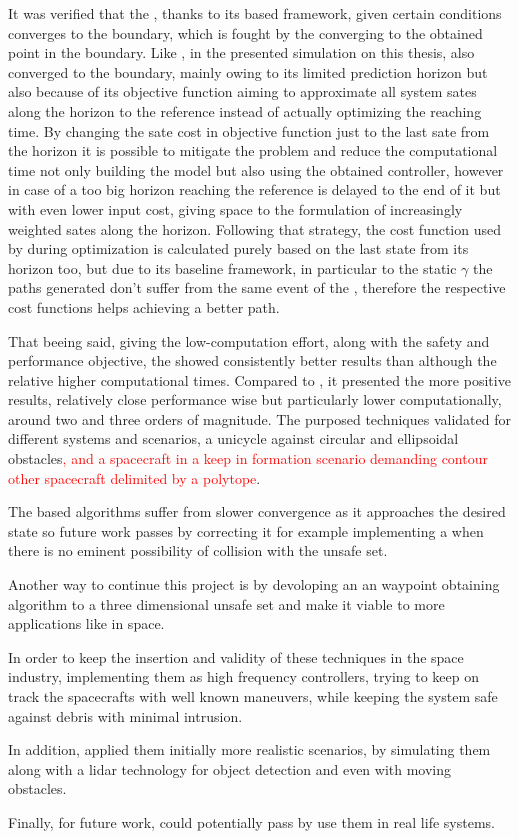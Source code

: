 It was verified that the , thanks to its based framework, given certain conditions converges to the boundary, which is fought by the  converging to the obtained point in the boundary. Like , in the presented simulation on this thesis,  also converged to the boundary, mainly owing to its limited prediction horizon but also because of its objective function aiming to approximate all system sates along the horizon to the reference instead of actually optimizing the reaching time. By changing the sate cost in objective function just to the last sate from the horizon it is possible to mitigate the problem and reduce the computational time not only building the  model but also using the obtained controller, however in case of a too big horizon reaching the reference is delayed to the end of it but with even lower input cost, giving space to the formulation of increasingly weighted sates along the horizon. Following that strategy, the cost function used by  during optimization is calculated purely based on the last state from its horizon too, but due to its baseline framework, in particular to the static \(\gamma\) the paths generated don't suffer from the same event of the , therefore the respective cost functions helps achieving a better path.       

That beeing said, giving the low-computation effort, along with the safety and performance objective, the  showed consistently better results than  although the relative higher computational times. Compared to , it presented the more positive results, relatively close performance wise but particularly lower computationally, around two and three orders of magnitude. The purposed techniques validated for different systems and scenarios, a unicycle against circular and ellipsoidal obstacles\textcolor{red}{, and a spacecraft in a keep in formation scenario demanding contour other spacecraft delimited by a polytope}.  

The  based algorithms suffer from slower convergence as it approaches the desired state so future work passes by correcting it for example implementing a  when there is no eminent possibility of collision with the unsafe set. 

Another way to continue this project is by devoloping an an waypoint obtaining algorithm to a three dimensional unsafe set and make it viable to more applications like in space. 

In order to keep the insertion and validity of these techniques in the space industry, implementing them as high frequency controllers, trying to keep on track the spacecrafts with well known maneuvers, while keeping the system safe against debris with minimal intrusion.  

In addition, applied them initially more realistic scenarios, by simulating them along with a lidar technology for object detection and even with moving obstacles.

Finally, for future work, could potentially pass by use them in real life systems. 
